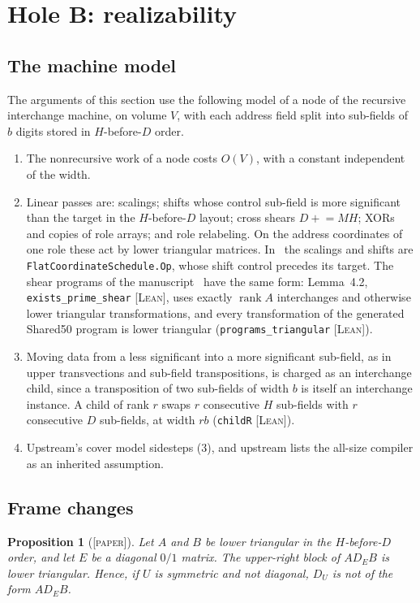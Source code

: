 \documentclass[11pt]{amsart}
\newtheorem{proposition}{Proposition}[section]
\newcommand{\lean}[1]{\texttt{#1}}
\newcommand{\tagL}{\textsc{[Lean]}}
\newcommand{\tagP}{\textsc{[paper]}}
\begin{document}
\section{Hole B: realizability}

\subsection{The machine model}\label{sec:model}
The arguments of this section use the following model of a node of the recursive interchange
machine, on volume $V$, with each address field split into sub-fields of $b$ digits stored in
$H$-before-$D$ order.
\begin{enumerate}
\item[(1)] The nonrecursive work of a node costs $O(V)$, with a constant independent of the
  width.
\item[(2)] Linear passes are: scalings; shifts whose control sub-field is more significant than
  the target in the $H$-before-$D$ layout; cross shears $D \mathrel{+}= M H$; XORs and copies of
  role arrays; and role relabeling. On the address coordinates of one role these act by lower
  triangular matrices. In~\cite{IMB} the scalings and shifts are \lean{FlatCoordinateSchedule.Op},
  whose shift control precedes its target. The shear programs of the manuscript~\cite{OAI} have the same form:
  Lemma~4.2, \lean{exists\_prime\_shear} \tagL{}, uses exactly $\operatorname{rank} A$
  interchanges and otherwise lower triangular transformations, and every transformation of the
  generated Shared50 program is lower triangular (\lean{programs\_triangular} \tagL{}).
\item[(3)] Moving data from a less significant into a more significant sub-field, as in upper
  transvections and sub-field transpositions, is charged as an interchange child, since a
  transposition of two sub-fields of width $b$ is itself an interchange instance. A child of
  rank $r$ swaps $r$ consecutive $H$ sub-fields with $r$ consecutive $D$ sub-fields, at width
  $r b$ (\lean{childR} \tagL{}).
\item[(4)] Upstream's cover model sidesteps (3), and upstream lists the all-size compiler as an
  inherited assumption.
\end{enumerate}

\subsection{Frame changes}
\begin{proposition}[\tagP]\label{prop:triangular}
Let $A$ and $B$ be lower triangular in the $H$-before-$D$ order, and let $E$ be a diagonal
$0/1$ matrix. The upper-right block of $A D_E B$ is lower triangular. Hence, if $U$ is symmetric
and not diagonal, $D_U$ is not of the form $A D_E B$.
\end{proposition}
\end{document}
